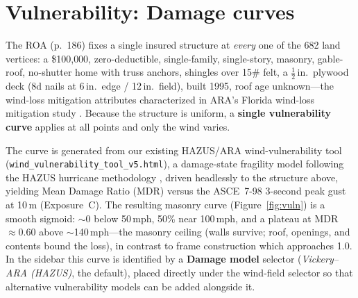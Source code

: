 \documentclass[11pt]{article}
\begin{document}
\section{Vulnerability: Damage curves}\label{sec:vuln}
The ROA (p.~186) fixes a single insured structure at \emph{every} one of the 682
land vertices: a \$100{,}000, zero-deductible, single-family, single-story,
masonry, gable-roof, no-shutter home with truss anchors, shingles over 15\# felt,
a $\tfrac12$\,in.\ plywood deck (8d nails at 6\,in.\ edge / 12\,in.\ field), built
1995, roof age unknown---the wind-loss mitigation attributes characterized in
ARA's Florida wind-loss mitigation study \cite{araoir2024}. Because the structure
is uniform, a \textbf{single vulnerability curve} applies at all points and only
the wind varies.

The curve is generated from our existing HAZUS/ARA wind-vulnerability tool
(\texttt{wind\_\allowbreak vulnerability\_\allowbreak tool\_\allowbreak v5.html}),
a damage-state fragility model following the HAZUS hurricane methodology
\cite{hazus,vickery2006}, driven headlessly to the structure
above, yielding Mean Damage Ratio (MDR) versus the ASCE~7-98 3-second peak gust at
10\,m (Exposure~C). The resulting masonry curve (Figure~\ref{fig:vuln}) is a smooth
sigmoid: $\sim$0 below 50\,mph, 50\% near 100\,mph, and a plateau at MDR~$\approx
0.60$ above $\sim$140\,mph---the masonry ceiling (walls survive; roof, openings,
and contents bound the loss), in contrast to frame construction which approaches
1.0. In the sidebar this curve is identified by a \textbf{Damage model} selector
(\emph{Vickery--ARA (HAZUS)}\cite{hazus,vickery2006}, the default), placed directly under the wind-field
selector so that alternative vulnerability models can be added alongside it.
\end{document}
